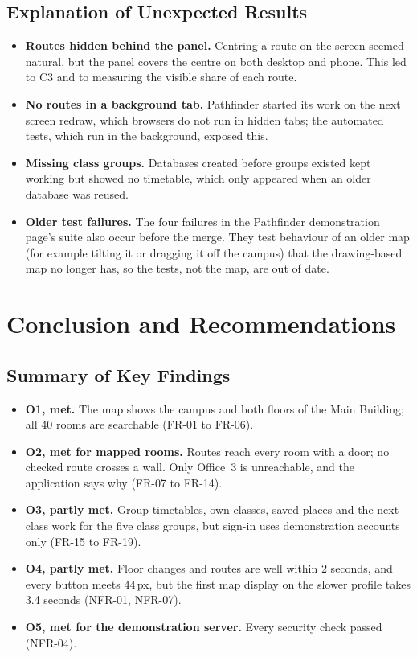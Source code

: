 \documentclass[12pt,a4paper]{report}
\begin{document}
\section{Explanation of Unexpected Results}\label{sec:unexpected}
\begin{itemize}
  \item \textbf{Routes hidden behind the panel.} Centring a route on the screen seemed natural, but the panel covers the centre on both desktop and phone. This led to C3 and to measuring the visible share of each route.
  \item \textbf{No routes in a background tab.} Pathfinder started its work on the next screen redraw, which browsers do not run in hidden tabs; the automated tests, which run in the background, exposed this.
  \item \textbf{Missing class groups.} Databases created before groups existed kept working but showed no timetable, which only appeared when an older database was reused.
  \item \textbf{Older test failures.} The four failures in the Pathfinder demonstration page's suite also occur before the merge. They test behaviour of an older map (for example tilting it or dragging it off the campus) that the drawing-based map no longer has, so the tests, not the map, are out of date.
\end{itemize}

\chapter{Conclusion and Recommendations}\label{ch:conclusion}

\section{Summary of Key Findings}
\begin{itemize}
  \item \textbf{O1, met.} The map shows the campus and both floors of the Main Building; all 40 rooms are searchable (FR-01 to FR-06).
  \item \textbf{O2, met for mapped rooms.} Routes reach every room with a door; no checked route crosses a wall. Only Office~3 is unreachable, and the application says why (FR-07 to FR-14).
  \item \textbf{O3, partly met.} Group timetables, own classes, saved places and the next class work for the five class groups, but sign-in uses demonstration accounts only (FR-15 to FR-19).
  \item \textbf{O4, partly met.} Floor changes and routes are well within 2 seconds, and every button meets 44\,px, but the first map display on the slower profile takes 3.4 seconds (NFR-01, NFR-07).
  \item \textbf{O5, met for the demonstration server.} Every security check passed (NFR-04).
\end{itemize}
\end{document}
